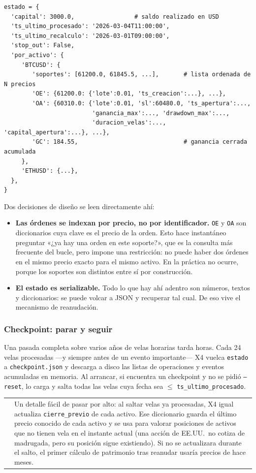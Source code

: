 \documentclass[11pt,a4paper]{article}
\makeatletter
\newcommand{\code}[1]{\texttt{\small #1}}
\newenvironment{nota}{%
  \par\medskip\noindent
  \begin{tabular}{@{}p{0.4em}@{\hspace{8pt}}p{\dimexpr\linewidth-2em\relax}@{}}
  \textcolor{cnaranja}{\rule{3pt}{1.1em}} &
}{\end{tabular}\par\medskip}
\newcommand{\bigsep}{\par\vspace{3pt}}
\makeatother
\begin{document}
\begin{lstlisting}
estado = {
  'capital': 3000.0,                 # saldo realizado en USD
  'ts_ultimo_procesado': '2026-03-04T11:00:00',
  'ts_ultimo_recalculo': '2026-03-01T09:00:00',
  'stop_out': False,
  'por_activo': {
     'BTCUSD': {
        'soportes': [61200.0, 61845.5, ...],       # lista ordenada de N precios
        'OE': {61200.0: {'lote':0.01, 'ts_creacion':...}, ...},
        'OA': {60310.0: {'lote':0.01, 'sl':60480.0, 'ts_apertura':...,
                         'ganancia_max':..., 'drawdown_max':...,
                         'duracion_velas':..., 'capital_apertura':...}, ...},
        'GC': 184.55,                              # ganancia cerrada acumulada
     },
     'ETHUSD': {...},
  },
}
\end{lstlisting}

\bigsep
Dos decisiones de diseño se leen directamente ahí:

\begin{itemize}[leftmargin=1.4em,itemsep=2pt]
\item \textbf{Las órdenes se indexan por precio, no por identificador.} \code{OE} y
\code{OA} son diccionarios cuya clave es el precio de la orden. Esto hace instantáneo
preguntar «¿ya hay una orden en este soporte?», que es la consulta más frecuente del bucle,
pero impone una restricción: no puede haber dos órdenes en el mismo precio exacto para el
mismo activo. En la práctica no ocurre, porque los soportes son distintos entre sí por
construcción.
\item \textbf{El estado es serializable.} Todo lo que hay ahí adentro son números, textos y
diccionarios: se puede volcar a JSON y recuperar tal cual. De eso vive el mecanismo de
reanudación.
\end{itemize}

\subsubsection{Checkpoint: parar y seguir}

Una pasada completa sobre varios años de velas horarias tarda horas. Cada 24 velas
procesadas —y siempre antes de un evento importante— X4 vuelca \code{estado} a
\code{checkpoint.json} y descarga a disco las listas de operaciones y eventos acumuladas en
memoria. Al arrancar, si encuentra un checkpoint y no se pidió \code{--reset}, lo carga y
salta todas las velas cuya fecha sea $\le$ \code{ts_ultimo_procesado}.

\begin{nota}
Un detalle fácil de pasar por alto: al saltar velas ya procesadas, X4 igual actualiza
\code{cierre_previo} de cada activo. Ese diccionario guarda el último precio conocido de
cada activo y se usa para valorar posiciones de activos que no tienen vela en el instante
actual (una acción de EE.UU.\ no cotiza de madrugada, pero su posición sigue existiendo).
Si no se actualizara durante el salto, el primer cálculo de patrimonio tras reanudar usaría
precios de hace meses.
\end{nota}
\end{document}
